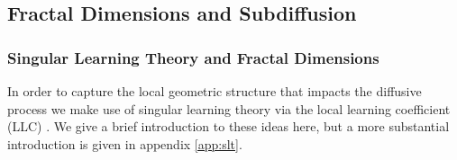 \documentclass{article} %
\theoremstyle{definition}
\begin{document}


\subsection{Fractal Dimensions and Subdiffusion}\label{sec:diff_coeff}

\subsubsection{Singular Learning Theory and Fractal Dimensions}\label{sec:slt_df}
In order to capture the local geometric structure that impacts the diffusive process we make use of singular learning theory \citep{Watanabe2009AlgebraicGA} via the local learning coefficient (LLC) \citep{lau2024locallearningcoefficientsingularityaware}. We give a brief introduction to these ideas here, but a more substantial introduction is given in appendix \ref{app:slt}.
\end{document}
